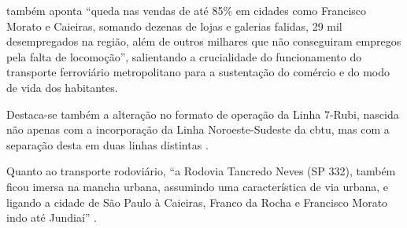      também aponta ``queda nas vendas de até 85\% em cidades como Francisco Morato e Caieiras, somando dezenas de lojas e galerias falidas, 29 mil desempregados na região, além de outros milhares que não conseguiram empregos pela falta de locomoção'', salientando a crucialidade do funcionamento do transporte ferroviário metropolitano para a sustentação do comércio e do modo de vida dos habitantes.
    
    Destaca-se também a alteração no formato de operação da Linha 7-Rubi, nascida não apenas com a incorporação da Linha Noroeste-Sudeste da \gls{cbtu}, mas com a separação desta em duas linhas distintas \cite[p.50]{ferreira2010a} \cite[p.223]{stefani2007a}.
    
    Quanto ao transporte rodoviário, ``a Rodovia Tancredo Neves (SP 332), também ficou imersa na mancha urbana, assumindo uma característica de via urbana, e ligando a cidade de São Paulo à Caieiras, Franco da Rocha e Francisco Morato indo até Jundiaí'' \cite[p.49]{suarez2014a}.
    
%
%

	\postextual
	
	
	
	
	\renewcommand{\glossaryname}{Glossário}
	\renewcommand*{\glsseeformat}[3][\seename]{\textit{#1}
		\glsseelist{#2}}
	
	
